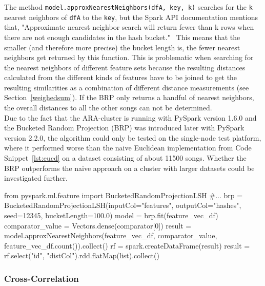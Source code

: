 \noindent The method \lstinline{model.approxNearestNeighbors(dfA, key, k)} searches for the \lstinline{k} nearest neighbors of \lstinline{dfA} to the \lstinline{key}, but the Spark API documentation mentions that, "Approximate nearest neighbor search will return fewer than k rows when there are not enough candidates in the hash bucket."~\cite{lshspark}
This means that the smaller (and therefore more precise) the bucket length is, the fewer nearest neighbors get returned by this function. This is problematic when searching for the nearest neighbors of different feature sets because the resulting distances calculated from the different kinds of features have to be joined to get the resulting similarities as a combination of different distance measurements (see Section~\ref{weighedsum}). If the BRP only returns a handful of nearest neighbors, the overall distances to all the other songs can not be determined.\\
\noindent Due to the fact that the ARA-cluster is running with PySpark version 1.6.0 and the Bucketed Random Projection (BRP) was introduced later with PySpark version 2.2.0, the algorithm could only be tested on the single-node test platform, where it performed worse than the naive Euclidean implementation from Code Snippet~\ref{lst:eucd} on a dataset consisting of about 11500 songs. Whether the BRP outperforms the naive approach on a cluster with larger datasets could be investigated further. 

\begin{pythonCode}[frame=single,label={lst:brp},caption={Bucketed Random Projection},captionpos=b]
from pyspark.ml.feature import BucketedRandomProjectionLSH
#...
brp = BucketedRandomProjectionLSH(inputCol="features", outputCol="hashes", seed=12345, bucketLength=100.0)
model = brp.fit(feature_vec_df)
comparator_value = Vectors.dense(comparator[0])
result = model.approxNearestNeighbors(feature_vec_df, comparator_value, feature_vec_df.count()).collect()
rf = spark.createDataFrame(result)
result = rf.select("id", "distCol").rdd.flatMap(list).collect()
\end{pythonCode}

 

\subsubsection{Cross-Correlation}


